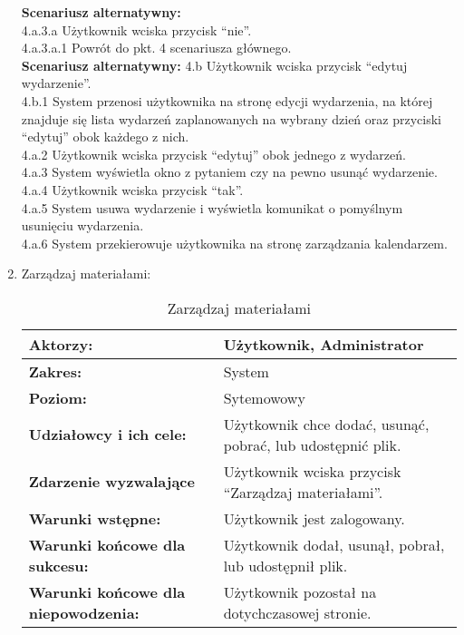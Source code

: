 \begin{enumerate}[label=(\Roman*)]
\textbf{Scenariusz alternatywny:}\\
4.a.3.a Użytkownik wciska przycisk “nie”.\\
4.a.3.a.1 Powrót do pkt. 4 scenariusza głównego.\\
\textbf{Scenariusz alternatywny:}
4.b Użytkownik wciska przycisk “edytuj wydarzenie”.\\
4.b.1 System przenosi użytkownika na stronę edycji wydarzenia, na której znajduje się lista
wydarzeń zaplanowanych na wybrany dzień oraz przyciski “edytuj” obok każdego z nich.\\
4.a.2 Użytkownik wciska przycisk “edytuj” obok jednego z wydarzeń.\\
4.a.3 System wyświetla okno z pytaniem czy na pewno usunąć wydarzenie.\\
4.a.4 Użytkownik wciska przycisk “tak”.\\
4.a.5 System usuwa wydarzenie i wyświetla komunikat o pomyślnym usunięciu wydarzenia.\\
4.a.6 System przekierowuje użytkownika na stronę zarządzania kalendarzem.\\

\item Zarządzaj materiałami:
	\begin{table}[H]
\centering
\caption{Zarządzaj materiałami}
\label{zarządzajmaterialami:}
\begin{tabular}{|p{7cm}|p{7cm}|}
  \hline 
  \textbf{Aktorzy:} & Użytkownik, Administrator\\
  \hline
  \textbf{Zakres:} & System \\
	\hline
  \textbf{Poziom:} & Sytemowowy \\
	\hline
  \textbf{Udziałowcy i ich cele: } & Użytkownik chce dodać, usunąć, pobrać, lub udostępnić plik. \\
	\hline
  \textbf{Zdarzenie wyzwalające } & Użytkownik wciska przycisk “Zarządzaj materiałami”. \\
	\hline
  \textbf{Warunki wstępne: } & Użytkownik jest zalogowany.
 \\
	\hline
  \textbf{Warunki końcowe dla sukcesu:} &Użytkownik dodał, usunął, pobrał, lub udostępnił plik.
 \\
	\hline
  \textbf{Warunki końcowe dla niepowodzenia:} & Użytkownik pozostał na dotychczasowej stronie. \\
  \hline
\end{tabular} 
\end{table}


\end{enumerate}

